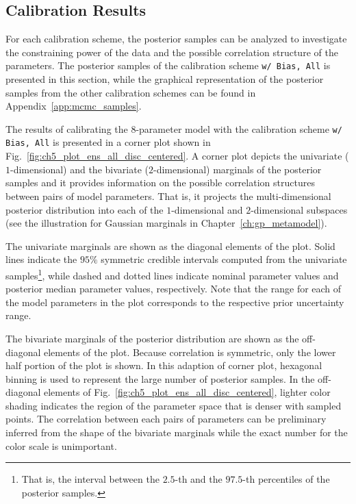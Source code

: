 \subsection{Calibration Results}\label{sub:bc_calibration_results}

For each calibration scheme, the posterior samples can be analyzed to investigate the constraining power of the data and the possible correlation structure of the parameters.
The posterior samples of the calibration scheme \texttt{w/ Bias, All} is presented in this section, while the graphical representation of the posterior samples from the other calibration schemes can be found in Appendix~\ref{app:mcmc_samples}.

The results of calibrating the $8$-parameter model with the calibration scheme \texttt{w/ Bias, All} is presented in a corner plot shown in Fig.~\ref{fig:ch5_plot_ens_all_disc_centered}.
A corner plot \cite{Foreman-Mackey2016} depicts the univariate ($1$-dimensional) and the bivariate ($2$-dimen\-sional) marginals of the posterior samples and it provides information on the possible correlation structures between pairs of model parameters.
That is, it projects the multi-dimensional posterior distribution into each of the $1$-dimensional and $2$-dimensional subspaces (see the illustration for Gaussian marginals in Chapter~\ref{ch:gp_metamodel}).

The univariate marginals are shown as the diagonal elements of the plot.
Solid lines indicate the $95\%$ symmetric credible intervals computed from the univariate samples\footnote{That is, the interval between the $2.5$-th and the $97.5$-th percentiles of the posterior samples.}, while dashed and dotted lines indicate nominal parameter values and posterior median parameter values, respectively.
Note that the range for each of the model parameters in the plot corresponds to the respective prior uncertainty range.

The bivariate marginals of the posterior distribution are shown as the off-diagonal elements of the plot.
Because correlation is symmetric, only the lower half portion of the plot is shown.
In this adaption of corner plot, hexagonal binning \cite{Carr2015} is used to represent the large number of posterior samples.
In the off-diagonal elements of Fig.~\ref{fig:ch5_plot_ens_all_disc_centered}, lighter color shading indicates the region of the parameter space that is denser with sampled points.
The correlation between each pairs of parameters can be preliminary inferred from the shape of the bivariate marginals while the exact number for the color scale is unimportant.


